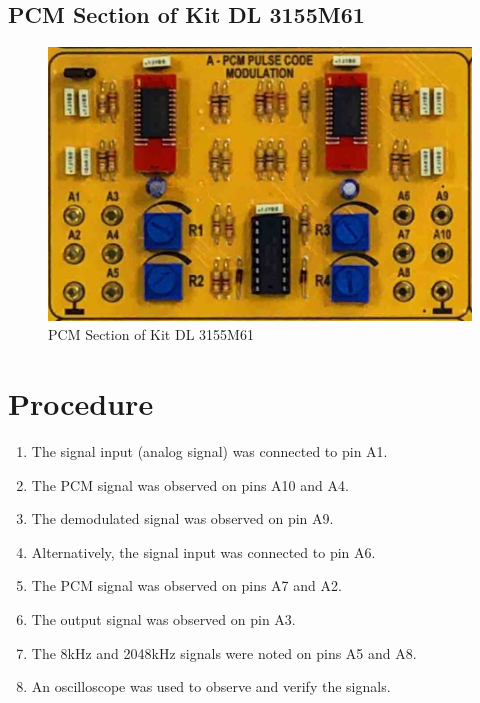 \documentclass[12pt]{article}
\begin{document}
\subsection*{PCM Section of Kit DL 3155M61}
\begin{figure}[H]
    \centering
    \includegraphics[width=.8\textwidth]{kit.jpg}
    \caption{PCM Section of Kit DL 3155M61}
    \label{fig:kit}
\end{figure}

\section*{Procedure}
\begin{enumerate}
    \item The signal input (analog signal) was connected to pin A1.
    \item The PCM signal was observed on pins A10 and A4.
    \item The demodulated signal was observed on pin A9.
    \item Alternatively, the signal input was connected to pin A6.
    \item The PCM signal was observed on pins A7 and A2.
    \item The output signal was observed on pin A3.
    \item The 8kHz and 2048kHz signals were noted on pins A5 and A8.
    \item An oscilloscope was used to observe and verify the signals.
\end{enumerate}


\end{document}
